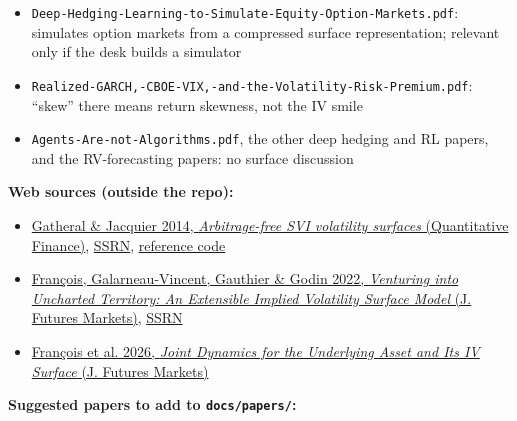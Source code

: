 \documentclass{article}
\begin{document}
\begin{itemize}

\item \texttt{Deep-\allowbreak{}Hedging-\allowbreak{}Learning-\allowbreak{}to-\allowbreak{}Simulate-\allowbreak{}Equity-\allowbreak{}Option-\allowbreak{}Markets.\allowbreak{}pdf}: simulates option markets from a compressed surface representation; relevant only if the desk builds a simulator

\item \texttt{Realized-\allowbreak{}GARCH,\allowbreak{}-\allowbreak{}CBOE-\allowbreak{}VIX,\allowbreak{}-\allowbreak{}and-\allowbreak{}the-\allowbreak{}Volatility-\allowbreak{}Risk-\allowbreak{}Premium.\allowbreak{}pdf}: ``skew'' there means return skewness, not the IV smile

\item \texttt{Agents-\allowbreak{}Are-\allowbreak{}not-\allowbreak{}Algorithms.\allowbreak{}pdf}, the other deep hedging and RL papers, and the RV-forecasting papers: no surface discussion

\end{itemize}

\textbf{Web sources (outside the repo):}

\begin{itemize}

\item \href{https://www.tandfonline.com/doi/abs/10.1080/14697688.2013.819986}{Gatheral \& Jacquier 2014, \emph{Arbitrage-free SVI volatility surfaces} (Quantitative Finance)}, \href{https://papers.ssrn.com/sol3/papers.cfm?abstract_id=2033323}{SSRN}, \href{https://github.com/JackJacquier/SSVI}{reference code}

\item \href{https://onlinelibrary.wiley.com/doi/abs/10.1002/fut.22364}{François, Galarneau-Vincent, Gauthier \& Godin 2022, \emph{Venturing into Uncharted Territory: An Extensible Implied Volatility Surface Model} (J. Futures Markets)}, \href{https://papers.ssrn.com/sol3/papers.cfm?abstract_id=3888243}{SSRN}

\item \href{https://onlinelibrary.wiley.com/doi/10.1002/fut.70068}{François et al. 2026, \emph{Joint Dynamics for the Underlying Asset and Its IV Surface} (J. Futures Markets)}

\end{itemize}

\textbf{Suggested papers to add to \texttt{docs/\allowbreak{}papers/\allowbreak{}}:}
\end{document}

